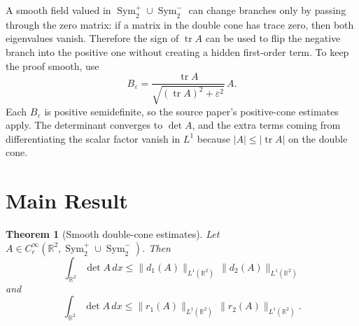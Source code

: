 \documentclass[11pt]{article}
\newtheorem{theorem}{Theorem}
\newcommand{\R}{\mathbb R}
\newcommand{\Sym}{\operatorname{Sym}}
\newcommand{\tr}{\operatorname{tr}}
\begin{document}
A smooth field valued in \(\Sym_2^+\cup\Sym_2^-\) can change branches only by
passing through the zero matrix: if a matrix in the double cone has trace zero,
then both eigenvalues vanish. Therefore the sign of \(\tr A\) can be used to
flip the negative branch into the positive one without creating a hidden
first-order term. To keep the proof smooth, use
\[
  B_\varepsilon
  =
  \frac{\tr A}{\sqrt{(\tr A)^2+\varepsilon^2}}\,A .
\]
Each \(B_\varepsilon\) is positive semidefinite, so the source paper's
positive-cone estimates apply. The determinant converges to \(\det A\), and the
extra terms coming from differentiating the scalar factor vanish in \(L^1\)
because \(|A|\leq |\tr A|\) on the double cone.

\section*{Main Result}

\begin{theorem}[Smooth double-cone estimates]
Let \(A\in C_c^\infty(\R^2,\Sym_2^+\cup\Sym_2^-)\). Then
\[
  \int_{\R^2}\det A\,dx
  \leq
  \|d_1(A)\|_{L^1(\R^2)}\,\|d_2(A)\|_{L^1(\R^2)}
\]
and
\[
  \int_{\R^2}\det A\,dx
  \leq
  \|r_1(A)\|_{L^1(\R^2)}\,\|r_2(A)\|_{L^1(\R^2)} .
\]
\end{theorem}
\end{document}
